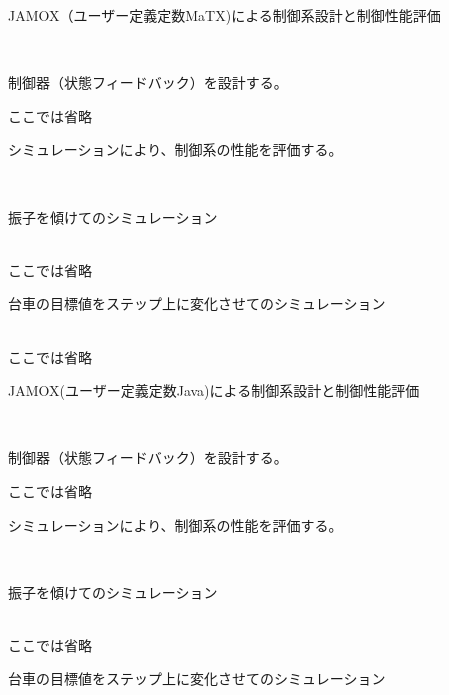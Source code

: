 \documentclass{jarticle}
\begin{document}
\begin{enumerate}
\begin{enumerate}
\begin{enumerate}
\begin{enumerate}
				\end{enumerate}
			\end{enumerate}
			{\Large\item JAMOX（ユーザー定義定数MaTX)による制御系設計と制御性能評価}\\
			\begin{enumerate}
				{\large\item 制御器（状態フィードバック）を設計する。}
				
					ここでは省略\\
				
				{\large\item シミュレーションにより、制御系の性能を評価する。}\\
				\begin{enumerate}
					{\item 振子を傾けてのシミュレーション}\\
					
						ここでは省略\\
					
					{\item 台車の目標値をステップ上に変化させてのシミュレーション}\\  
					
						ここでは省略\\
					
				\end{enumerate}
			\end{enumerate}
			{\Large\item JAMOX(ユーザー定義定数Java)による制御系設計と制御性能評価}\\
			\begin{enumerate}
				{\large\item 制御器（状態フィードバック）を設計する。}
				
					ここでは省略\\
				
				{\large\item シミュレーションにより、制御系の性能を評価する。}\\
				\begin{enumerate}
					{\item 振子を傾けてのシミュレーション}\\
					
						ここでは省略\\
					
					{\item 台車の目標値をステップ上に変化させてのシミュレーション}\\
					

\end{enumerate}
\end{enumerate}
\end{enumerate}
\end{enumerate}
\end{document}
